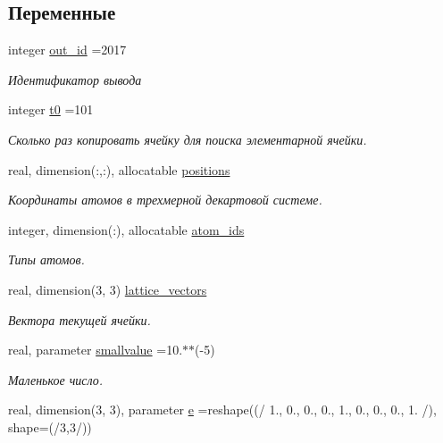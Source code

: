 \subsection*{Переменные}
\begin{DoxyCompactItemize}
\item 
integer \mbox{\hyperlink{namespacecrystal__lattice_a297a8f77c70b997ba6967443326cd549}{out\+\_\+id}} =2017
\begin{DoxyCompactList}\small\item\em Идентификатор вывода \end{DoxyCompactList}\item 
integer \mbox{\hyperlink{namespacecrystal__lattice_a8ff442188723d34f67cad873e47bb5ad}{t0}} =101
\begin{DoxyCompactList}\small\item\em Сколько раз копировать ячейку для поиска элементарной ячейки. \end{DoxyCompactList}\item 
real, dimension(\+:,\+:), allocatable \mbox{\hyperlink{namespacecrystal__lattice_a65687f01a2e1edcce4350543b69ef312}{positions}}
\begin{DoxyCompactList}\small\item\em Координаты атомов в трехмерной декартовой системе. \end{DoxyCompactList}\item 
integer, dimension(\+:), allocatable \mbox{\hyperlink{namespacecrystal__lattice_adf237967e114c0d9d219fdd66a5e40d0}{atom\+\_\+ids}}
\begin{DoxyCompactList}\small\item\em Типы атомов. \end{DoxyCompactList}\item 
real, dimension(3, 3) \mbox{\hyperlink{namespacecrystal__lattice_a241136293ff688704ae81d069144f5ea}{lattice\+\_\+vectors}}
\begin{DoxyCompactList}\small\item\em Вектора текущей ячейки. \end{DoxyCompactList}\item 
real, parameter \mbox{\hyperlink{namespacecrystal__lattice_ac13001be81194a82292d9ca561b000d3}{smallvalue}} =10.$\ast$$\ast$(-\/5)
\begin{DoxyCompactList}\small\item\em Маленькое число. \end{DoxyCompactList}\item 
real, dimension(3, 3), parameter \mbox{\hyperlink{namespacecrystal__lattice_af8549fdb12c45e36845321078acf5a90}{e}} =reshape((/ 1., 0., 0., 0., 1., 0., 0., 0., 1. /), shape=(/3,3/))
$$
\end{DoxyCompactItemize}
